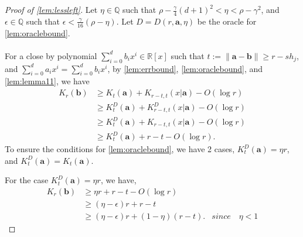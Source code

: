 \documentclass[a4paper,UKenglish,cleveref,autoref,thm-restate]{lipics-v2021}
\begin{document}
\begin{proof}[Proof of \cref{lem:lessleft}]
  Let $\eta\in\mathbb{Q}$ such that $\rho-\frac{\gamma}{4}(d+1)^2<\eta<\rho-\gamma^2$, and $\epsilon\in\mathbb{Q}$ such that $\epsilon<\frac{\gamma}{16}(\rho-\eta)$. Let $D=D(r,\mathbf{a},\eta)$ be the oracle for \cref{lem:oraclebound}. \\
  \\
  For a close by polynomial $\sum_{i=0}^db_ix^i\in\mathbb{R}[x]$ such
  that $t:=\|\mathbf{a}-\mathbf{b}\|\geq r-sh_j$, and
  $\sum_{i=0}^{d}a_ix^i=\sum_{i=0}^{d}b_ix^i$, by \cref{lem:errbound},
  \cref{lem:oraclebound}, and \cref{lem:lemma11}, we have
	\begin{align*}
          K_r(\mathbf{b})
          &\geq K_t(\mathbf{a}) + K_{r-t,t}(x|\mathbf{a})-O(\log r)\\
          &\geq K_t^D(\mathbf{a})+K_{r-t,t}^D(x|\mathbf{a})-O(\log r)\\
          &\geq K_t^D(\mathbf{a})+K_{r-t,t}(x|\mathbf{a})-O(\log r)\\
          &\geq K_t^D(\mathbf{a})+r-t-O(\log r).
	\end{align*}
	To ensure the conditions for \cref{lem:oraclebound}, we have 2 cases, $K_t^D(\mathbf{a})=\eta r$, and $K_t^D(\mathbf{a})=K_t(\mathbf{a})$. 
	
	For the case $K_t^D(\mathbf{a})=\eta r$, we have, 
	\begin{align*}
		K_r(\mathbf{b})&\geq\eta r+r-t-O(\log r)\\
		&\geq\left(\eta-\epsilon\right)r+r-t\\
		&\geq(\eta-\epsilon)r+(1-\eta)(r-t).&\textit{since }\textit{ $\eta<1$}%
	\end{align*}
	

\end{proof}
\end{document}
